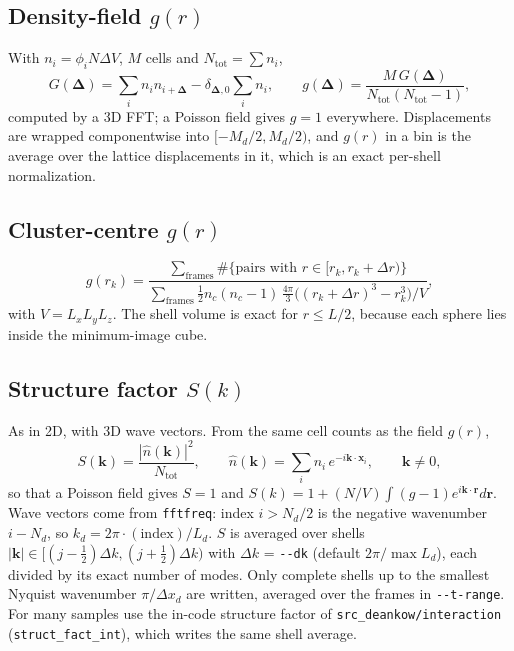 \documentclass[11pt]{article}
\newcommand{\code}[1]{\texttt{#1}}
\begin{document}
\subsection{\texorpdfstring{Density-field $g(r)$}{Density-field g(r)}}
With $n_i=\phi_iN\Delta V$, $M$ cells and $N_{\mathrm{tot}}=\sum n_i$,
\begin{equation}
  G(\boldsymbol\Delta)=\sum_in_in_{i+\boldsymbol\Delta}-\delta_{\boldsymbol\Delta,0}\sum_in_i,
  \qquad g(\boldsymbol\Delta)=\frac{M\,G(\boldsymbol\Delta)}{N_{\mathrm{tot}}(N_{\mathrm{tot}}-1)},
\end{equation}
computed by a 3D FFT; a Poisson field gives $g=1$ everywhere. Displacements
are wrapped componentwise into $[-M_d/2,M_d/2)$, and $g(r)$ in a bin is the
average over the lattice displacements in it, which is an exact per-shell
normalization.

\subsection{\texorpdfstring{Cluster-centre $g(r)$}{Cluster-centre g(r)}}
\begin{equation}
  g(r_k)=\frac{\sum_{\text{frames}}\#\{\text{pairs with } r\in[r_k,r_k+\Delta r)\}}
  {\sum_{\text{frames}}\tfrac12n_c(n_c-1)\,\tfrac{4\pi}{3}\bigl((r_k+\Delta r)^3-r_k^3\bigr)/V},
\end{equation}
with $V=L_xL_yL_z$. The shell volume is exact for $r\le L/2$, because each
sphere lies inside the minimum-image cube.

\subsection{\texorpdfstring{Structure factor $S(k)$}{Structure factor S(k)}}
As in 2D, with 3D wave vectors. From the same cell counts as the field $g(r)$,
\begin{equation}
  S(\mathbf k) = \frac{|\hat n(\mathbf k)|^2}{N_{\mathrm{tot}}}, \qquad
  \hat n(\mathbf k) = \sum_i n_i\,e^{-i\mathbf k\cdot\mathbf x_i}, \qquad \mathbf k\ne0 ,
\end{equation}
so that a Poisson field gives $S=1$ and
$S(k)=1+(N/V)\int(g-1)e^{i\mathbf k\cdot\mathbf r}d\mathbf r$. Wave vectors come
from \code{fftfreq}: index $i>N_d/2$ is the negative wavenumber $i-N_d$, so
$k_d=2\pi\cdot(\text{index})/L_d$. $S$ is averaged over shells
$|\mathbf k|\in[(j-\tfrac12)\Delta k,(j+\tfrac12)\Delta k)$ with
$\Delta k$ = \code{-{}-dk} (default $2\pi/\max L_d$), each divided by its exact
number of modes. Only complete shells up to the smallest Nyquist wavenumber
$\pi/\Delta x_d$ are written, averaged over the frames in \code{-{}-t-range}.
For many samples use the in-code structure factor of
\code{src\_deankow/interaction} (\code{struct\_fact\_int}), which writes the same
shell average.
\end{document}
